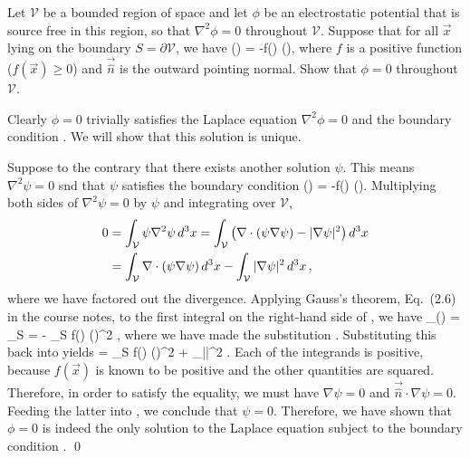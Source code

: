 \newcommand{\cV}{\mathcal{V}}
\newcommand{\lap}{\nabla^2}
\newcommand{\vx}{\vec{x}}
\newcommand{\dV}{\partial \cV}
\newcommand{\nh}{\vec{\hat{n}}}
\newcommand{\dcx}{\dd[3]{x}}
\newcommand{\vE}{\vec{E}}
\newcommand{\En}{E_n}
\newcommand{\dS}{\dd{S}}

\begin{statement}{}
	Let $\cV$ be a bounded region of space and let $\phi$ be an electrostatic potential that is source free in this region, so that $\lap\phi = 0$ throughout $\cV$.  Suppose that for all $\vx$ lying on the boundary $S = \dV$, we have
	\beqn \label{given}
		\phi(\vx) = -f(\vx) \nh \cdot \nabla \psi(\vx),
	\eeqn
	where $f$ is a positive function ($f(\vx) \geq 0$) and $\nh$ is the outward pointing normal.  Show that $\phi = 0$ throughout $\cV$.
\end{statement}

\begin{solution}
	Clearly $\phi = 0$ trivially satisfies the Laplace equation $\lap\phi = 0$ and the boundary condition .  We will show that this solution is unique.
	
	Suppose to the contrary that there exists another solution $\psi$.  This means $\lap\psi = 0$ snd that $\psi$ satisfies the boundary condition
	\beqn \label{psibound}
		\psi(\vx) = -f(\vx) \nh \cdot \nabla \psi(\vx).
	\eeqn
	Multiplying both sides of $\lap\psi = 0$ by $\psi$ and integrating over $\cV$,
	\begin{align}
		0 &= \int_\cV \psi \lap \psi \dcx
		= \int_\cV \left( \nabla \cdot (\psi \nabla \psi) - |\nabla \psi|^2 \right) \dcx \notag \\
		&= \int_\cV \nabla \cdot (\psi \nabla \psi) \dcx - \int_\cV |\nabla \psi|^2 \dcx, \label{thing}
	\end{align}
	where we have factored out the divergence.  Applying Gauss's theorem, Eq.~(2.6) in the course notes, to the first integral on the right-hand side of , we have
	\beq
		\int_\cV \nabla \cdot (\psi \nabla \psi) \dcx = \int_S \psi \nh \cdot \nabla\psi \dS
		= - \int_S f(\vx) (\nh \cdot \nabla \psi)^2 \dS,
	\eeq
	where we have made the substitution .  Substituting this back into  yields
	 = \int_S f(\vx) (\nh \cdot \nabla \psi)^2 \dS + \int_\cV |\nabla \psi|^2 \dcx.
	\eeq
	Each of the integrands is positive, because $f(\vx)$ is known to be positive and the other quantities are squared.  Therefore, in order to satisfy the equality, we must have $\nabla \psi = 0$ and $\nh \cdot \nabla \psi = 0$.  Feeding the latter into , we conclude that $\psi = 0$.  Therefore, we have shown that $\phi = 0$ is indeed the only solution to the Laplace equation subject to the boundary condition . \qed
\end{solution}